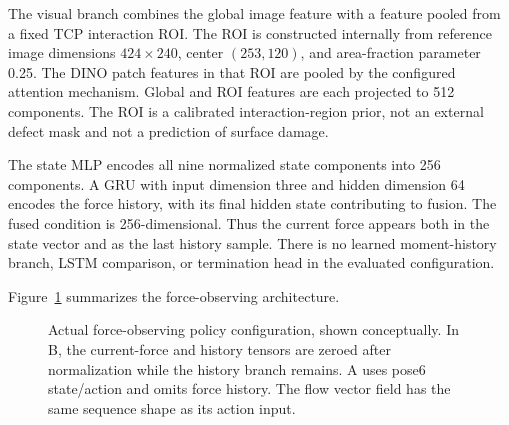 The visual branch combines the global image feature with a feature pooled from a fixed TCP interaction ROI. The ROI is constructed internally from reference image dimensions \(424\times240\), center \((253,120)\), and area-fraction parameter 0.25. The DINO patch features in that ROI are pooled by the configured attention mechanism. Global and ROI features are each projected to 512 components. The ROI is a calibrated interaction-region prior, not an external defect mask and not a prediction of surface damage.

The state MLP encodes all nine normalized state components into 256 components. A GRU with input dimension three and hidden dimension 64 encodes the force history, with its final hidden state contributing to fusion. The fused condition is 256-dimensional. Thus the current force appears both in the state vector and as the last history sample. There is no learned moment-history branch, LSTM comparison, or termination head in the evaluated configuration.

Figure~\ref{fig:force_history_policy} summarizes the force-observing architecture.

\begin{figure}[tbp]\centering
{}
\caption[Implemented policy architecture]{Actual force-observing policy configuration, shown conceptually. In B, the current-force and history tensors are zeroed after normalization while the history branch remains. A uses pose6 state/action and omits force history. The flow vector field has the same sequence shape as its action input.}
\label{fig:force_history_policy}
\end{figure}

